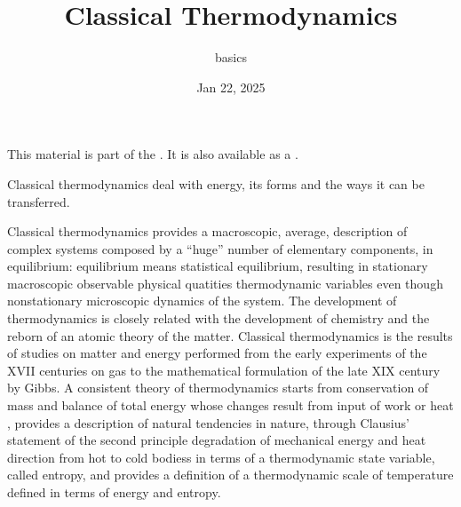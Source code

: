 \documentclass[letterpaper,10pt,english]{jupyterBook}
\title{Classical Thermodynamics}
\date{Jan 22, 2025}
\author{basics}
\begin{document}
\pagestyle{empty}
\sphinxmaketitle
\pagestyle{plain}
\sphinxtableofcontents
\pagestyle{normal}
\label{\detokenize{intro::doc}}


\sphinxAtStartPar
This material is part of the . It is also available as a .

\sphinxAtStartPar
Classical thermodynamics deal with energy, its forms and the ways it can be transferred.

\sphinxAtStartPar
Classical thermodynamics provides a macroscopic, average, description of complex systems composed by a “huge” number of elementary components, in equilibrium: equilibrium means statistical equilibrium, resulting in stationary macroscopic observable physical quatities \sphinxhyphen{} thermodynamic variables \sphinxhyphen{} even though non\sphinxhyphen{}stationary microscopic dynamics of the system. The development of thermodynamics is closely related with the development of chemistry and the re\sphinxhyphen{}born of an atomic theory of the matter. Classical thermodynamics is the results of studies on matter and energy performed from the early experiments of the XVII centuries on gas to the mathematical formulation of the late XIX century by Gibbs. A consistent theory of thermodynamics starts from conservation of mass and balance of total energy \sphinxhyphen{} whose changes result from input of work or heat \sphinxhyphen{}, provides a description of natural tendencies in nature, through Clausius’ statement of the second principle \sphinxhyphen{} degradation of mechanical energy and heat direction from hot to cold bodiess \sphinxhyphen{} in terms of a thermodynamic state variable, called entropy, and provides a definition of a thermodynamic scale of temperature \sphinxhyphen{} defined in terms of energy and entropy.



\sphinxstepscope
\end{document}
